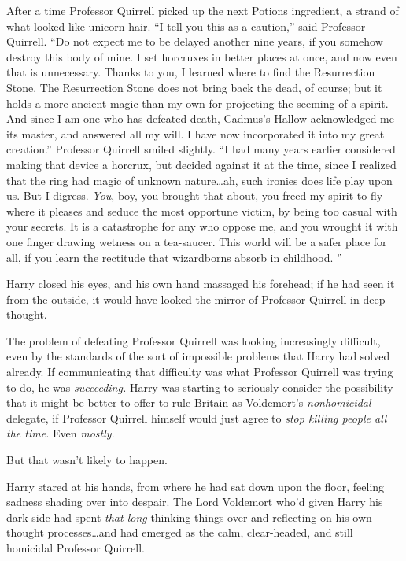 After a time Professor Quirrell picked up the next Potions ingredient, a strand
of what looked like unicorn hair. “I tell you this as a caution,” said
Professor Quirrell. “Do not expect me to be delayed another nine years, if you
somehow destroy this body of mine. I set horcruxes in better places at once,
and now even that is unnecessary. Thanks to you, I learned where to find the
Resurrection Stone. The Resurrection Stone does not bring back the dead, of
course; but it holds a more ancient magic than my own for projecting the
seeming of a spirit. And since I am one who has defeated death, Cadmus’s Hallow
acknowledged me its master, and answered all my will. I have now incorporated
it into my great creation.” Professor Quirrell smiled slightly. “I had many
years earlier considered making that device a horcrux, but decided against it
at the time, since I realized that the ring had magic of unknown nature…ah,
such ironies does life play upon us. But I digress. \emph{You}, boy, you
brought that about, you freed my spirit to fly where it pleases and seduce the
most opportune victim, by being too casual with your secrets. It is a
catastrophe for any who oppose me, and you wrought it with one finger drawing
wetness on a tea-saucer. This world will be a safer place for all, if you learn
the rectitude that wizardborns absorb in childhood. ”

Harry closed his eyes, and his own hand massaged his forehead; if he had seen
it from the outside, it would have looked the mirror of Professor Quirrell in
deep thought.

The problem of defeating Professor Quirrell was looking increasingly difficult,
even by the standards of the sort of impossible problems that Harry had solved
already. If communicating that difficulty was what Professor Quirrell was
trying to do, he was \emph{succeeding.} Harry was starting to seriously
consider the possibility that it might be better to offer to rule Britain as
Voldemort’s \emph{nonhomicidal} delegate, if Professor Quirrell himself would
just agree to \emph{stop killing people all the time.} Even \emph{mostly}.

But that wasn’t likely to happen.

Harry stared at his hands, from where he had sat down upon the floor, feeling
sadness shading over into despair. The Lord Voldemort who’d given Harry his
dark side had spent \emph{that long} thinking things over and reflecting on his
own thought processes…and had emerged as the calm, clear-headed, and
still homicidal Professor Quirrell.

